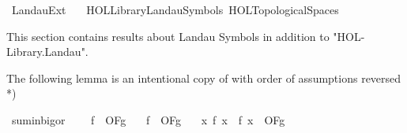 %
\begin{isabellebody}%
%
%
\isadelimdocument
%
\endisadelimdocument
%
\isatagdocument
%
\isamarkuptrue%
%
\endisatagdocument
{\isafolddocument}%
%
\isadelimdocument
%
\endisadelimdocument
%
\isadelimtheory
%
\endisadelimtheory
%
\isatagtheory
{}\isamarkupfalse%
\ Landau{\isacharunderscore}{\kern0pt}Ext\isanewline
\ \ \ {\isachardoublequoteopen}HOL{\isacharminus}{\kern0pt}Library{\isachardot}{\kern0pt}Landau{\isacharunderscore}{\kern0pt}Symbols{\isachardoublequoteclose}\ {\isachardoublequoteopen}HOL{\isachardot}{\kern0pt}Topological{\isacharunderscore}{\kern0pt}Spaces{\isachardoublequoteclose}\isanewline
{}%
\endisatagtheory
{\isafoldtheory}%
%
\isadelimtheory
%
\endisadelimtheory
%
\begin{isamarkuptext}%
This section contains results about Landau Symbols in addition to "HOL-Library.Landau".%
\end{isamarkuptext}\isamarkuptrue%
%
\begin{isamarkuptext}%
The following lemma is an intentional copy of  with order of assumptions reversed *)%
\end{isamarkuptext}\isamarkuptrue%
\isamarkupfalse%
\ sum{\isacharunderscore}{\kern0pt}in{\isacharunderscore}{\kern0pt}bigo{\isacharunderscore}{\kern0pt}r{\isacharcolon}{\kern0pt}\ \isanewline
\ \ \ {\isachardoublequoteopen}f{}\ {\isasymin}\ O{\isacharbrackleft}{\kern0pt}F{\isacharprime}{\kern0pt}{\isacharbrackright}{\kern0pt}{\isacharparenleft}{\kern0pt}g{\isacharparenright}{\kern0pt}{\isachardoublequoteclose}\isanewline
\ \ \ {\isachardoublequoteopen}f{}\ {\isasymin}\ O{\isacharbrackleft}{\kern0pt}F{\isacharprime}{\kern0pt}{\isacharbrackright}{\kern0pt}{\isacharparenleft}{\kern0pt}g{\isacharparenright}{\kern0pt}{\isachardoublequoteclose}\isanewline
\ \ \ {\isachardoublequoteopen}{\isacharparenleft}{\kern0pt}{\isasymlambda}x{\isachardot}{\kern0pt}\ f{}\ x\ {\isacharplus}{\kern0pt}\ f{}\ x{\isacharparenright}{\kern0pt}\ {\isasymin}\ O{\isacharbrackleft}{\kern0pt}F{\isacharprime}{\kern0pt}{\isacharbrackright}{\kern0pt}{\isacharparenleft}{\kern0pt}g{\isacharparenright}{\kern0pt}{\isachardoublequoteclose}\isanewline
%
\isadelimproof
\ \ %
\endisadelimproof
%
\isatagproof
{}\isamarkupfalse%

\end{isabellebody}
